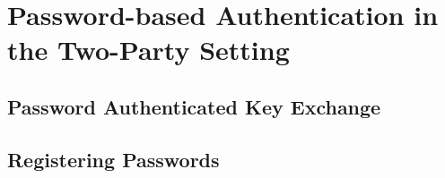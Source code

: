 \chapter{Password-based Authentication in the Two-Party Setting}


\section{Password Authenticated Key Exchange}

\section{Registering Passwords}
